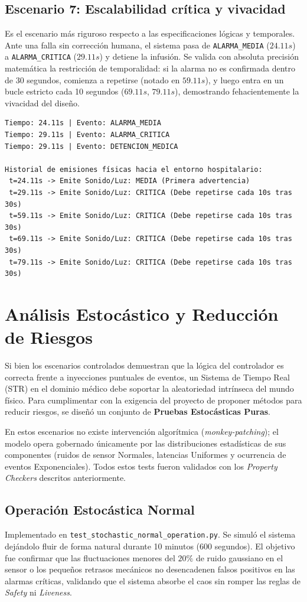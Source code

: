 \subsection{Escenario 7: Escalabilidad crítica y vivacidad}
Es el escenario más riguroso respecto a las especificaciones lógicas y temporales. Ante una falla sin corrección humana, el sistema pasa de \texttt{ALARMA\_MEDIA} ($24.11s$) a \texttt{ALARMA\_CRITICA} ($29.11s$) y detiene la infusión. Se valida con absoluta precisión matemática la restricción de temporalidad: si la alarma no es confirmada dentro de 30 segundos, comienza a repetirse (notado en $59.11s$), y luego entra en un bucle estricto cada 10 segundos ($69.11s$, $79.11s$), demostrando fehacientemente la vivacidad del diseño.
\begin{verbatim}
Tiempo: 24.11s | Evento: ALARMA_MEDIA
Tiempo: 29.11s | Evento: ALARMA_CRITICA
Tiempo: 29.11s | Evento: DETENCION_MEDICA

Historial de emisiones físicas hacia el entorno hospitalario:
 t=24.11s -> Emite Sonido/Luz: MEDIA (Primera advertencia)
 t=29.11s -> Emite Sonido/Luz: CRITICA (Debe repetirse cada 10s tras 30s)
 t=59.11s -> Emite Sonido/Luz: CRITICA (Debe repetirse cada 10s tras 30s)
 t=69.11s -> Emite Sonido/Luz: CRITICA (Debe repetirse cada 10s tras 30s)
 t=79.11s -> Emite Sonido/Luz: CRITICA (Debe repetirse cada 10s tras 30s)
\end{verbatim}

\section{Análisis Estocástico y Reducción de Riesgos}

Si bien los escenarios controlados demuestran que la lógica del controlador es correcta frente a inyecciones puntuales de eventos, un Sistema de Tiempo Real (STR) en el dominio médico debe soportar la aleatoriedad intrínseca del mundo físico. Para cumplimentar con la exigencia del proyecto de proponer métodos para reducir riesgos, se diseñó un conjunto de \textbf{Pruebas Estocásticas Puras}. 

En estos escenarios no existe intervención algorítmica (\textit{monkey-patching}); el modelo opera gobernado únicamente por las distribuciones estadísticas de sus componentes (ruidos de sensor Normales, latencias Uniformes y ocurrencia de eventos Exponenciales). Todos estos tests fueron validados con los \textit{Property Checkers} descritos anteriormente.

\subsection{Operación Estocástica Normal}
Implementado en \texttt{test\_stochastic\_normal\_operation.py}. Se simuló el sistema dejándolo fluir de forma natural durante 10 minutos (600 segundos). El objetivo fue confirmar que las fluctuaciones menores del $20\%$ de ruido gaussiano en el sensor o los pequeños retrasos mecánicos no desencadenen falsos positivos en las alarmas críticas, validando que el sistema absorbe el caos sin romper las reglas de \textit{Safety} ni \textit{Liveness}.

